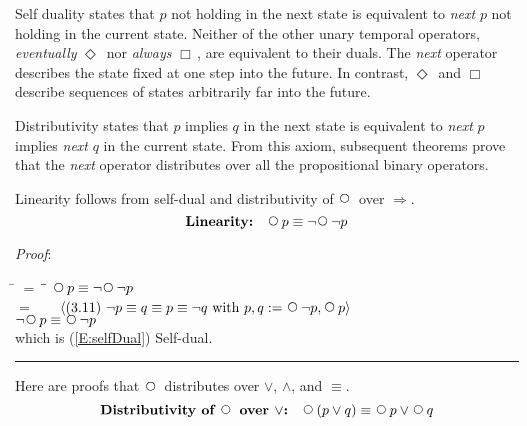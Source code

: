 \documentclass[12pt, fleqn, leqno]{article}
\newcommand{\lgap}{2pt}                             %
\newcommand{\mymathindent}{24pt}                    %
\newcommand{\impl}{\ensuremath{\Rightarrow}}        %
\newcommand{\Next}{\;\,\text{\raisebox{3.5pt}{\circle{6}}}}
\newcommand{\Event}{\Diamond\,}
\newcommand{\Always}{\Box\,}
\newcommand{\myqed}{\rule[-.23ex]{1.2ex}{2.0ex}}
\newcommand{\myqedtab}{\hspace{384pt}}              %
\newcommand{\Gll} {\langle}                         %
\newcommand{\Ggg} {\rangle}                         %
\newcommand{\Hint}[1]     {\ \ \ $\Gll              \mbox{#1} \Ggg$ }   %
\begin{document}
Self duality states that $p$ not holding in the next state is equivalent to \textit{next} $p$ not holding in the current state.
Neither of the other unary temporal operators, \textit{eventually} $\Event$ nor \textit{always} $\Always$, are equivalent to their duals.
The \textit{next} operator describes the state fixed at one step into the future.
In contrast, $\Event$ and $\Always$ describe sequences of states arbitrarily far into the future.

Distributivity states that $p$ implies $q$ in the next state is equivalent to \textit{next} $p$ implies \textit{next} $q$ in the current state.
From this axiom, subsequent theorems prove that the \textit{next} operator distributes over all the propositional binary operators.

Linearity follows from self-dual and distributivity of $\Next$ over $\impl$.
\begin{equation}\label{E:linearity}
\textbf{Linearity:}\quad \Next p \equiv \neg\Next\neg p
\end{equation}

\emph{Proof}:
\begin{tabbing}
\hspace{\mymathindent} \= $= \;$ \= \myqedtab \= \kill
  \> \>   $\Next p \equiv \neg\Next\neg p$\\[\lgap]
  \> $=$  \>  \Hint{(3.11) $\neg p \equiv q \equiv p \equiv \neg q$ with $p,q := \Next\neg p, \Next p$} \\[\lgap]
  \> \>   $\neg\Next p \equiv \Next\neg p$ \\[\lgap]
  \> which is (\ref{E:selfDual}) Self-dual. \quad \myqed
\end{tabbing}

Here are proofs that $\Next$ distributes over $\lor$, $\land$, and $\equiv$.
\begin{equation}\label{E:distNextOr}
\textbf{Distributivity of $\Next$ over $\lor$:}\quad \Next (p \lor q) \equiv \Next p \lor \Next q
\end{equation}
\end{document}

